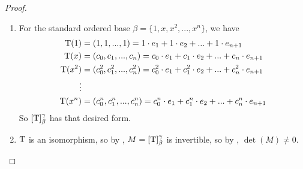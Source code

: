 \begin{proof} \ 

\begin{enumerate}
\item
For the standard ordered base \(\beta = \{ 1, x, x^2, ..., x^n \}\), we have
\begin{align*}
    \mathrm{T}(1) & = (1, 1, ..., 1) = 1 \cdot e_1 + 1 \cdot e_2 + ... + 1 \cdot e_{n+1} \\
    \mathrm{T}(x) & = (c_0, c_1, ..., c_n) = c_0 \cdot e_1 + c_1 \cdot e_2 + ... + c_n \cdot e_{n+1} \\
    \mathrm{T}(x^2) & = (c_0^2, c_1^2, ..., c_n^2) = c_0^2 \cdot e_1 + c_1^2 \cdot e_2 + ... + c_n^2 \cdot e_{n+1} \\
    \vdots \\
    \mathrm{T}(x^n) & = (c_0^n, c_1^n, ..., c_n^n) = c_0^n \cdot e_1 + c_1^n \cdot e_2 + ... + c_n^n \cdot e_{n+1}
\end{align*}
So \([\mathrm{T}]_{\beta}^{\gamma}\) has that desired form.

\item \(\mathrm{T}\) is an isomorphism, so by , \(M = [\mathrm{T}]_{\beta}^{\gamma}\) is invertible, so by , \(\det(M) \ne 0\).


\end{enumerate}
\end{proof}
